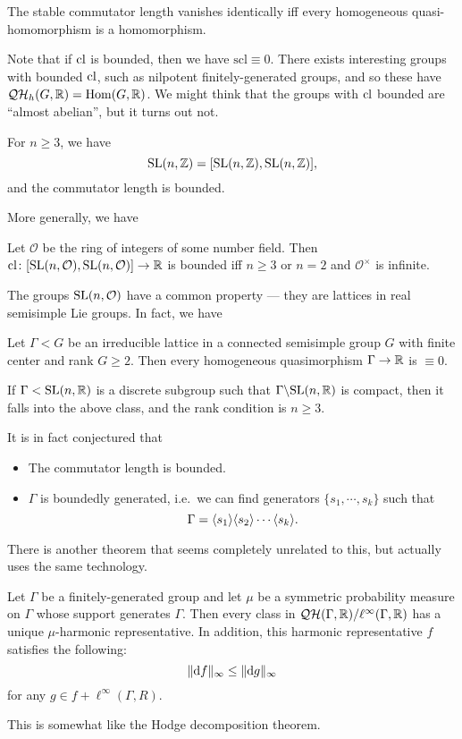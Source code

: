 \documentclass[a4paper]{article}
\newcommand\QH{\mathcal{QH}}
\newcommand\scl{\mathrm{scl}}
\begin{document}
\begin{cor}
  The stable commutator length vanishes identically iff every homogeneous quasi-homomorphism is a homomorphism.
\end{cor}

Note that if $\operatorname{cl}$ is bounded, then we have $\scl \equiv 0$. There exists interesting groups with bounded $\operatorname{cl}$, such as nilpotent finitely-generated groups, and so these have $\QH_h(G, \R) = \Hom(G, \R)$. We might think that the groups with $\operatorname{cl}$ bounded are ``almost abelian'', but it turns out not.

\begin{thm}
  For $n \geq 3$, we have
  \[
    \mathrm{SL}(n, \mathbb{Z}) = [\mathrm{SL}(n, \mathbb{Z}), \mathrm{SL}(n, \mathbb{Z})],
  \]
  and the commutator length is bounded.
\end{thm}

More generally, we have
\begin{thm}
  Let $\mathcal{O}$ be the ring of integers of some number field. Then $\operatorname{cl}\colon [\mathrm{SL}(n, \mathcal{O}), \mathrm{SL}(n, \mathcal{O})] \to \mathbb{R}$ is bounded iff $n \geq 3$ or $n = 2$ and $\mathcal{O}^\times$ is infinite.
\end{thm}
The groups $\mathrm{SL}(n, \mathcal{O})$ have a common property --- they are lattices in real semisimple Lie groups. In fact, we have

\begin{thm}
  Let $\Gamma < G$ be an irreducible lattice in a connected semisimple group $G$ with finite center and rank $G \geq 2$. Then every homogeneous quasimorphism $\Gamma \to \mathbb{R}$ is $\equiv 0$.
\end{thm}

\begin{eg}
  If $\Gamma < \mathrm{SL}(n, \mathbb{R})$ is a discrete subgroup such that $\Gamma \backslash \mathrm{SL}(n, \mathbb{R})$ is compact, then it falls into the above class, and the rank condition is $n \geq 3$.
\end{eg}
It is in fact conjectured that
\begin{itemize}
  \item The commutator length is bounded.
  \item $\Gamma$ is boundedly generated, i.e.\ we can find generators $\{s_1, \cdots, s_k\}$ such that
    \[
      \Gamma = \langle s_1 \rangle \langle s_2\rangle \cdots \langle s_k\rangle.
    \]
\end{itemize}

There is another theorem that seems completely unrelated to this, but actually uses the same technology.
\begin{thm}
  Let $\Gamma$ be a finitely-generated group and let $\mu$ be a symmetric probability measure on $\Gamma$ whose support generates $\Gamma$. Then every class in $\QH(\Gamma, \R)/\ell^\infty(\Gamma, \R)$ has a unique $\mu$-harmonic representative. In addition, this harmonic representative $f$ satisfies the following:
  \[
    \|\mathrm{d} f\|_\infty \leq \|\mathrm{d} g\|_\infty
  \]
  for any $g \in f+ \ell^\infty(\Gamma, R)$.
\end{thm}
This is somewhat like the Hodge decomposition theorem.
\end{document}
